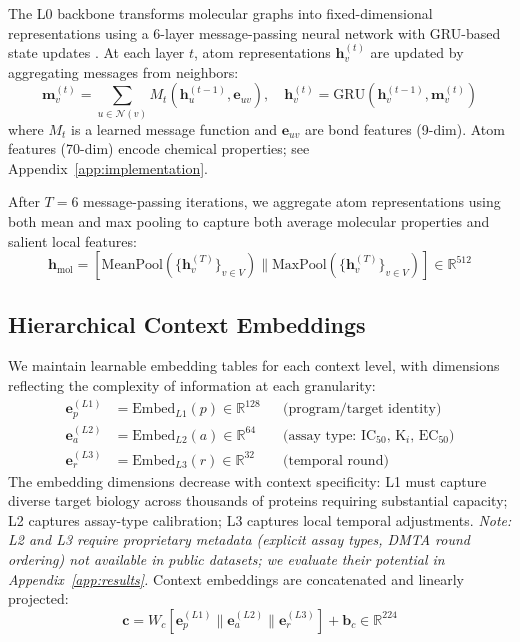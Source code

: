 \documentclass{article}
\newcommand{\hmol}{\mathbf{h}_{\text{mol}}}
\begin{document}
The L0 backbone transforms molecular graphs into fixed-dimensional representations using a 6-layer message-passing neural network with GRU-based state updates \citep{li_2016_gru_gnn}. At each layer $t$, atom representations $\mathbf{h}_v^{(t)}$ are updated by aggregating messages from neighbors:
\begin{equation}
    \mathbf{m}_v^{(t)} = \sum_{u \in \mathcal{N}(v)} M_t(\mathbf{h}_u^{(t-1)}, \mathbf{e}_{uv}), \quad \mathbf{h}_v^{(t)} = \text{GRU}(\mathbf{h}_v^{(t-1)}, \mathbf{m}_v^{(t)})
\end{equation}
where $M_t$ is a learned message function and $\mathbf{e}_{uv}$ are bond features (9-dim). Atom features (70-dim) encode chemical properties; see Appendix~\ref{app:implementation}.

After $T=6$ message-passing iterations, we aggregate atom representations using both mean and max pooling to capture both average molecular properties and salient local features:
\begin{equation}
    \hmol = [\text{MeanPool}(\{\mathbf{h}_v^{(T)}\}_{v \in V}) \| \text{MaxPool}(\{\mathbf{h}_v^{(T)}\}_{v \in V})] \in \mathbb{R}^{512}
\end{equation}

\subsection{Hierarchical Context Embeddings}

We maintain learnable embedding tables for each context level, with dimensions reflecting the complexity of information at each granularity:
\begin{align}
    \mathbf{e}_p^{(L1)} &= \text{Embed}_{L1}(p) \in \mathbb{R}^{128} && \text{(program/target identity)} \\
    \mathbf{e}_a^{(L2)} &= \text{Embed}_{L2}(a) \in \mathbb{R}^{64} && \text{(assay type: IC$_{50}$, K$_i$, EC$_{50}$)} \\
    \mathbf{e}_r^{(L3)} &= \text{Embed}_{L3}(r) \in \mathbb{R}^{32} && \text{(temporal round)}
\end{align}
The embedding dimensions decrease with context specificity: L1 must capture diverse target biology across thousands of proteins requiring substantial capacity; L2 captures assay-type calibration; L3 captures local temporal adjustments. \textit{Note: L2 and L3 require proprietary metadata (explicit assay types, DMTA round ordering) not available in public datasets; we evaluate their potential in Appendix~\ref{app:results}.} Context embeddings are concatenated and linearly projected:
\begin{equation}
    \mathbf{c} = W_c [\mathbf{e}_p^{(L1)} \| \mathbf{e}_a^{(L2)} \| \mathbf{e}_r^{(L3)}] + \mathbf{b}_c \in \mathbb{R}^{224}
\end{equation}
\end{document}
